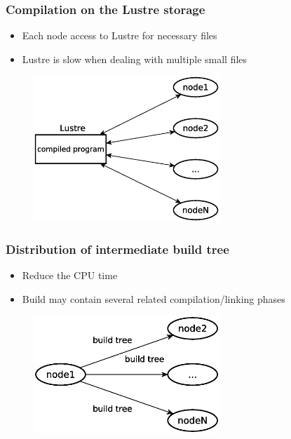 \begin{frame}
\frametitle{Compilation on the Lustre storage}
\begin{itemize}
\item Each node access to Lustre for necessary files
\item Lustre is slow when dealing with multiple small files
\end{itemize}
	\begin{figure}
		\includegraphics[width=70mm]{image/compLustre}
	\end{figure}	
\end{frame}


\begin{frame}
\frametitle{Distribution of intermediate build tree}
\begin{itemize}
\item Reduce the CPU time
\item Build may contain several related compilation/linking phases
\end{itemize}
	\begin{figure}
		\includegraphics[width=70mm]{image/compTree}
	\end{figure}	
\end{frame}


